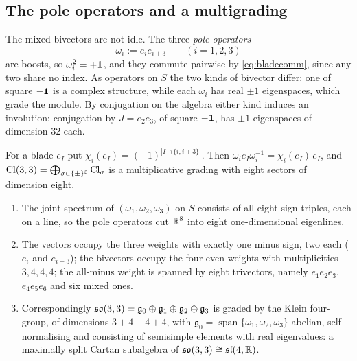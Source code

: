 \subsection{The pole operators and a multigrading}
\label{sec:grading}

The mixed bivectors are not idle. The three \emph{pole operators}
\[
\omega_i:=e_ie_{i+3}\qquad(i=1,2,3)
\]
are boosts, so $\omega_i^2=+\mathbf 1$, and they commute pairwise by \eqref{eq:bladecomm}, since any two share no index. As operators on $S$ the
two kinds of bivector differ: one of square $-\mathbf 1$ is a complex structure, while each $\omega_i$ has real $\pm1$ eigenspaces, which grade the
module. By conjugation on the algebra either kind induces an involution: conjugation by $J=e_2e_3$, of square $-\mathbf 1$, has $\pm1$ eigenspaces of
dimension $32$ each.

\begin{proposition}[A $\Z_2^3$ grading of $\Cl(3,3)$]
\label{prop:grading}
For a blade $e_I$ put $\chi_i(e_I)=(-1)^{|I\cap\{i,i+3\}|}$. Then $\omega_ie_I\omega_i^{-1}=\chi_i(e_I)\,e_I$, and
$\mathrm{Cl}(3,3)=\bigoplus_{\sigma\in\{\pm\}^3}\mathrm{Cl}_\sigma$ is a multiplicative grading with eight sectors of dimension eight.
\begin{enumerate}[label=(\roman*),leftmargin=2.2em]
\item The joint spectrum of $(\omega_1,\omega_2,\omega_3)$ on $S$ consists of all eight sign triples, each on a line, so the
pole operators cut $\mathbb{R}^8$ into eight one-dimensional eigenlines.
\item The vectors occupy the three weights with exactly one minus sign, two each ($e_i$ and $e_{i+3}$); the bivectors occupy
the four even weights with multiplicities $3,4,4,4$; the all-minus weight is spanned by eight trivectors, namely $e_1e_2e_3$,
$e_4e_5e_6$ and six mixed ones.
\item Correspondingly $\mathfrak{so}(3,3)=\mathfrak g_0\oplus\mathfrak g_1\oplus\mathfrak g_2\oplus\mathfrak g_3$ is graded by the Klein
four-group, of dimensions $3+4+4+4$, with $\mathfrak g_0=\operatorname{span}\{\omega_1,\omega_2,\omega_3\}$ abelian,
self-normalising and consisting of semisimple elements with real eigenvalues: a maximally split Cartan subalgebra of
$\mathfrak{so}(3,3)\cong\mathfrak{sl}(4,\mathbb{R})$.
\end{enumerate}
\end{proposition}

